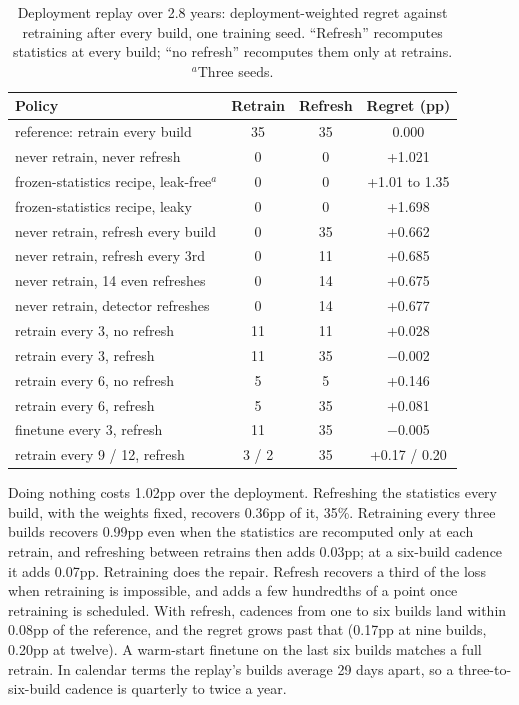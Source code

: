 \documentclass[journal]{IEEEtran}
\begin{document}
\begin{table}[t]
\caption{Deployment replay over 2.8 years: deployment-weighted regret
against retraining after every build, one training seed. ``Refresh''
recomputes statistics at every build; ``no refresh'' recomputes them
only at retrains. $^{a}$Three seeds.}
\label{tab:regret}
\centering
\footnotesize
\setlength{\tabcolsep}{3pt}
\begin{tabular}{lccc}
\toprule
Policy & Retrain & Refresh & Regret (pp) \\
\midrule
reference: retrain every build & 35 & 35 & 0.000 \\
\midrule
never retrain, never refresh & 0 & 0 & +1.021 \\
\quad frozen-statistics recipe, leak-free$^{a}$ & 0 & 0 & +1.01 to 1.35 \\
\quad frozen-statistics recipe, leaky & 0 & 0 & +1.698 \\
\midrule
never retrain, refresh every build & 0 & 35 & +0.662 \\
never retrain, refresh every 3rd & 0 & 11 & +0.685 \\
never retrain, 14 even refreshes & 0 & 14 & +0.675 \\
never retrain, detector refreshes & 0 & 14 & +0.677 \\
\midrule
retrain every 3, no refresh & 11 & 11 & +0.028 \\
retrain every 3, refresh & 11 & 35 & $-$0.002 \\
retrain every 6, no refresh & 5 & 5 & +0.146 \\
retrain every 6, refresh & 5 & 35 & +0.081 \\
finetune every 3, refresh & 11 & 35 & $-$0.005 \\
retrain every 9 / 12, refresh & 3 / 2 & 35 & +0.17 / 0.20 \\
\bottomrule
\end{tabular}
\end{table}

Doing nothing costs 1.02pp over the deployment. Refreshing the
statistics every build, with the weights fixed, recovers 0.36pp of it,
35\%. Retraining every three builds recovers 0.99pp even when the
statistics are recomputed only at each retrain, and refreshing between
retrains then adds 0.03pp; at a six-build cadence it adds 0.07pp.
Retraining does the repair. Refresh recovers a third of the loss when
retraining is impossible, and adds a few hundredths of a point once
retraining is scheduled. With refresh, cadences from one to six builds
land within 0.08pp of the reference, and the regret grows past that
(0.17pp at nine builds, 0.20pp at twelve). A warm-start finetune on the
last six builds matches a full retrain. In calendar terms the replay's
builds average 29 days apart, so a three-to-six-build cadence is
quarterly to twice a year.
\end{document}
